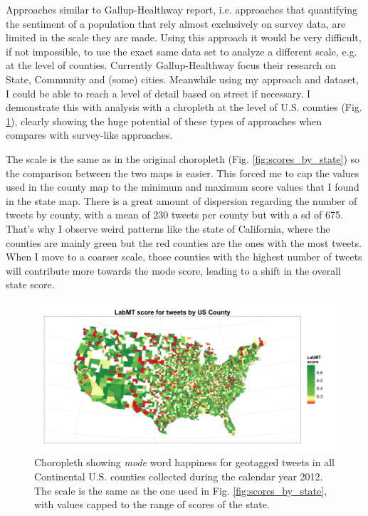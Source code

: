\documentclass{llncs}
\begin{document}
Approaches similar to Gallup-Healthway report, i.e. approaches that quantifying the sentiment of a population that rely almost exclusively on survey data, are limited in the scale they are made. Using this approach it would be very difficult, if not impossible, to use the exact same data set to analyze a different scale, e.g. at the level of counties. Currently Gallup-Healthway focus their research on State, Community and (some) cities. Meanwhile using my approach and dataset, I could be able to reach a level of detail based on street if necessary. I demonstrate this with analysis with a chropleth at the level of U.S. counties (Fig. \ref{fig:scores_by_county}), clearly showing the huge potential of these types of approaches when compares with survey-like approaches.

The scale is the same as in the original choropleth (Fig. \ref{fig:scores_by_state}) so the comparison between the two maps is easier. This forced me to cap the values used in the county map to the minimum and maximum score values that I found in the state map. There is a great amount of dispersion regarding the number of tweets by county, with a mean of 230 tweets per county but with a sd of 675. That's why I observe weird patterns like the state of California, where the counties are mainly green but the red counties are the ones with the most tweets. When I move to a coarser scale, those counties with the highest number of tweets will contribute more towards the mode score, leading to a shift in the overall state score.

\begin{figure}
\centering
\includegraphics[width=\textwidth]{images/scores_by_county}
\caption{Choropleth showing \emph{mode} word happiness for geotagged tweets in all Continental U.S. counties collected during the calendar year 2012. The scale is the same as the one used in Fig. \ref{fig:scores_by_state}, with values capped to the range of scores of the state.}
\label{fig:scores_by_county}
\end{figure}
\end{document}
